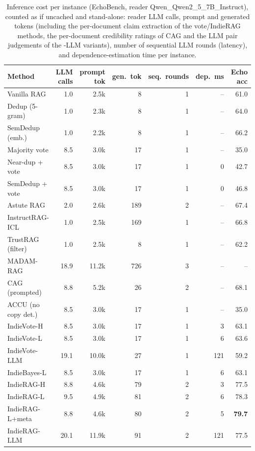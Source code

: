 \begin{table}[tbp]
\centering
\small
\caption{Inference cost per instance (EchoBench, reader Qwen\_Qwen2\_5\_7B\_Instruct), counted as if uncached and stand-alone: reader LLM calls, prompt and generated tokens (including the per-document claim extraction of the vote/IndieRAG methods, the per-document credibility ratings of CAG and the LLM pair judgements of the -LLM variants), number of sequential LLM rounds (latency), and dependence-estimation time per instance.}
\label{tab:cost}
\setlength{\tabcolsep}{4pt}
\begin{tabular}{lrrrrrr}
\toprule
Method & LLM calls & prompt tok & gen.\ tok & seq.\ rounds & dep.\ ms & Echo acc \\
\midrule
Vanilla RAG & 1.0 & 2.5k & 8 & 1 & -- & 61.0 \\
Dedup (5-gram) & 1.0 & 2.3k & 8 & 1 & -- & 64.0 \\
SemDedup (emb.) & 1.0 & 2.2k & 8 & 1 & -- & 66.2 \\
Majority vote & 8.5 & 3.0k & 17 & 1 & -- & 35.0 \\
Near-dup + vote & 8.5 & 3.0k & 17 & 1 & 0 & 42.7 \\
SemDedup + vote & 8.5 & 3.0k & 17 & 1 & 0 & 46.8 \\
Astute RAG & 2.0 & 2.6k & 189 & 2 & -- & 67.4 \\
InstructRAG-ICL & 1.0 & 2.5k & 169 & 1 & -- & 66.8 \\
TrustRAG (filter) & 1.0 & 2.5k & 8 & 1 & -- & 62.2 \\
MADAM-RAG & 18.9 & 11.2k & 726 & 3 & -- & -- \\
CAG (prompted) & 8.8 & 5.2k & 26 & 2 & -- & 68.1 \\
ACCU (no copy det.) & 8.5 & 3.0k & 17 & 1 & -- & 35.0 \\
\midrule
IndieVote-H & 8.5 & 3.0k & 17 & 1 & 3 & 63.1 \\
IndieVote-L & 8.5 & 3.0k & 17 & 1 & 6 & 63.6 \\
IndieVote-LLM & 19.1 & 10.0k & 27 & 1 & 121 & 59.2 \\
IndieBayes-L & 8.5 & 3.0k & 17 & 1 & 6 & 63.1 \\
IndieRAG-H & 8.8 & 4.6k & 79 & 2 & 3 & 77.5 \\
IndieRAG-L & 9.5 & 4.9k & 81 & 2 & 6 & 78.3 \\
IndieRAG-L+meta & 8.8 & 4.6k & 80 & 2 & 5 & \textbf{79.7} \\
IndieRAG-LLM & 20.1 & 11.9k & 91 & 2 & 121 & 77.5 \\
\bottomrule
\end{tabular}
\end{table}
